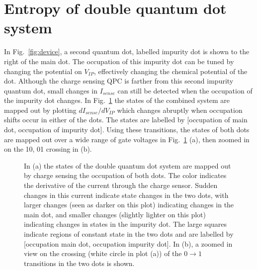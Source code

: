 \section{Entropy of double quantum dot system}
\label{sec:dqd}

In Fig.~\ref{fig:device}, a second quantum dot, labelled impurity dot is shown to the right of the main dot. The occupation of this impurity dot can be tuned by changing the potential on $V_{IP}$, effectively changing the chemical potential of the dot. Although the charge sensing \ac{QPC} is farther from this second impurity quantum dot, small changes in $I_{sense}$ can still be detected when the occupation of the impurity dot changes. In Fig.~\ref{fig:qdpanel2} the states of the combined system are mapped out by plotting $dI_{sense}/dV_{IP}$ which changes abruptly when occupation shifts occur in either of the dots. The states are labelled by [occupation of main dot, occupation of impurity dot]. Using these transitions, the states of both dots are mapped out over a wide range of gate voltages in Fig.~\ref{fig:qdpanel2} (a), then zoomed in on the 10, 01 crossing in (b).

\begin{figure}[h]
\centering
{}
\caption{In (a) the states of the double quantum dot system are mapped out by charge sensing the occupation of both dots. The color indicates the derivative of the current through the charge sensor. Sudden changes in this current indicate state changes in the two dots, with larger changes (seen as darker on this plot) indicating changes in the main dot, and smaller changes (slightly lighter on this plot) indicating changes in states in the impurity dot. The large squares indicate regions of constant state in the two dots and are labelled by [occupation main dot, occupation impurity dot]. In (b), a zoomed in view on the crossing (white circle in plot (a)) of the $0 \to 1$ transitions in the two dots is shown.}
\label{fig:qdpanel2}       %
\end{figure}

